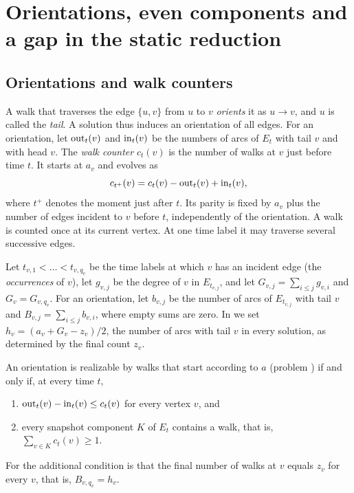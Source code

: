 \section{Orientations, even components and a gap in the static reduction}\label{sec:char}

\subsection{Orientations and walk counters}

A walk that traverses the edge $\{u,v\}$ from $u$ to $v$ \emph{orients} it as $u\to v$, and $u$ is called the \emph{tail}. A solution thus induces an orientation of all edges. For an orientation, let $\mathrm{out}_t(v)$ and $\mathrm{in}_t(v)$ be the numbers of arcs of $E_t$ with tail $v$ and with head $v$. The \emph{walk counter} $c_t(v)$ is the number of walks at $v$ just before time $t$. It starts at $a_v$ and evolves as
\[
  c_{t^+}(v)=c_t(v)-\mathrm{out}_t(v)+\mathrm{in}_t(v),
\]
where $t^+$ denotes the moment just after $t$. Its parity is fixed by $a_v$ plus the number of edges incident to $v$ before $t$, independently of the orientation. A walk is counted once at its current vertex. At one time label it may traverse several successive edges.

Let $t_{v,1}<\dots<t_{v,q_v}$ be the time labels at which $v$ has an incident edge (the \emph{occurrences} of $v$), let $g_{v,j}$ be the degree of $v$ in $E_{t_{v,j}}$, and let $G_{v,j}=\sum_{i\le j}g_{v,i}$ and $G_v=G_{v,q_v}$. For an orientation, let $b_{v,j}$ be the number of arcs of $E_{t_{v,j}}$ with tail $v$ and $B_{v,j}=\sum_{i\le j}b_{v,i}$, where empty sums are zero. In \FIX{} we set $h_v=(a_v+G_v-z_v)/2$, the number of arcs with tail $v$ in every solution, as determined by the final count $z_v$.

\begin{theorem}\label{thm:char}
An orientation is realizable by walks that start according to $a$ (problem \FREE{}) if and only if, at every time $t$,
\begin{enumerate}
\item[(i)] $\mathrm{out}_t(v)-\mathrm{in}_t(v)\le c_t(v)$ for every vertex $v$, and
\item[(ii)] every snapshot component $K$ of $E_t$ contains a walk, that is, $\sum_{v\in K}c_t(v)\ge 1$.
\end{enumerate}
For \FIX{} the additional condition is that the final number of walks at $v$ equals $z_v$ for every $v$, that is, $B_{v,q_v}=h_v$.
\end{theorem}

